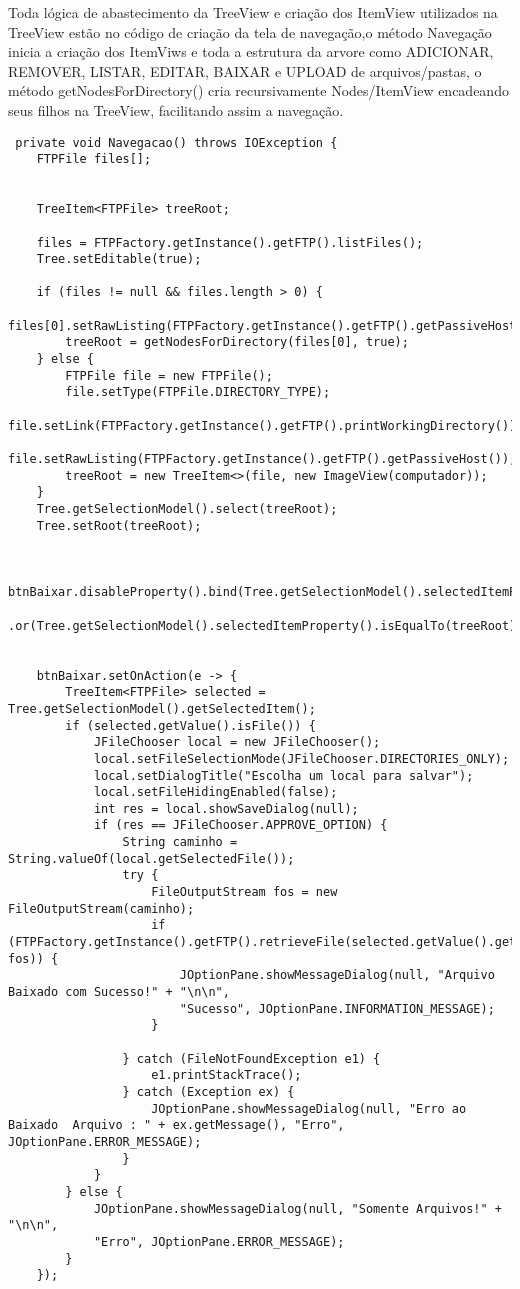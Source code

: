 \documentclass[12pt]{article}
\begin{document}
Toda lógica de abastecimento da TreeView e criação dos ItemView utilizados na TreeView estão no código de criação da tela de navegação,o método Navegação inicia a criação dos ItemViws e toda a estrutura da arvore como ADICIONAR, REMOVER, LISTAR, EDITAR, BAIXAR e UPLOAD de arquivos/pastas, o método getNodesForDirectory() cria recursivamente Nodes/ItemView encadeando seus filhos na TreeView, facilitando assim a navegação.

\begin{lstlisting}
 private void Navegacao() throws IOException {
	FTPFile files[];
	
	
	TreeItem<FTPFile> treeRoot;
	
	files = FTPFactory.getInstance().getFTP().listFiles();
	Tree.setEditable(true);
	
	if (files != null && files.length > 0) {
		files[0].setRawListing(FTPFactory.getInstance().getFTP().getPassiveHost());
		treeRoot = getNodesForDirectory(files[0], true);
	} else {
		FTPFile file = new FTPFile();
		file.setType(FTPFile.DIRECTORY_TYPE);
		file.setLink(FTPFactory.getInstance().getFTP().printWorkingDirectory());
		file.setRawListing(FTPFactory.getInstance().getFTP().getPassiveHost());
		treeRoot = new TreeItem<>(file, new ImageView(computador));
	}
	Tree.getSelectionModel().select(treeRoot);
	Tree.setRoot(treeRoot);
	
	
	btnBaixar.disableProperty().bind(Tree.getSelectionModel().selectedItemProperty().isNull()
	.or(Tree.getSelectionModel().selectedItemProperty().isEqualTo(treeRoot)));
	
	
	btnBaixar.setOnAction(e -> {
		TreeItem<FTPFile> selected = Tree.getSelectionModel().getSelectedItem();
		if (selected.getValue().isFile()) {
			JFileChooser local = new JFileChooser();
			local.setFileSelectionMode(JFileChooser.DIRECTORIES_ONLY);
			local.setDialogTitle("Escolha um local para salvar");
			local.setFileHidingEnabled(false);
			int res = local.showSaveDialog(null);
			if (res == JFileChooser.APPROVE_OPTION) {
				String caminho = String.valueOf(local.getSelectedFile());
				try {
					FileOutputStream fos = new FileOutputStream(caminho);
					if (FTPFactory.getInstance().getFTP().retrieveFile(selected.getValue().getLink(), fos)) {
						JOptionPane.showMessageDialog(null, "Arquivo Baixado com Sucesso!" + "\n\n",
						"Sucesso", JOptionPane.INFORMATION_MESSAGE);
					}
					
				} catch (FileNotFoundException e1) {
					e1.printStackTrace();
				} catch (Exception ex) {
					JOptionPane.showMessageDialog(null, "Erro ao Baixado  Arquivo : " + ex.getMessage(), "Erro", JOptionPane.ERROR_MESSAGE);
				}
			}
		} else {
			JOptionPane.showMessageDialog(null, "Somente Arquivos!" + "\n\n",
			"Erro", JOptionPane.ERROR_MESSAGE);
		}
	});
	

\end{lstlisting}
\end{document}
